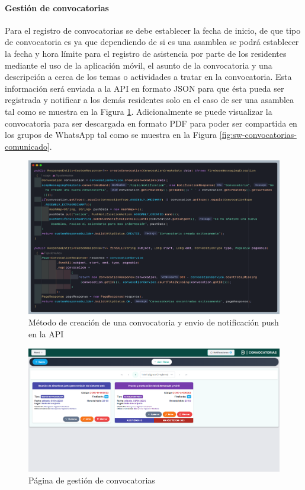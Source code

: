 \paragraph{Gestión de convocatorias}

Para el registro de convocatorias se debe establecer la fecha de inicio, de que tipo de convocatoria es ya que dependiendo de si es una asamblea se podrá establecer la fecha y hora límite para el registro de asistencia por parte de los residentes mediante el uso de la aplicación móvil, el asunto de la convocatoria y una descripción a cerca de los temas o actividades a tratar en la convocatoria.
Esta información será enviada a la API en formato JSON para que ésta pueda ser registrada y notificar a los demás residentes solo en el caso de ser una asamblea tal como se muestra en la Figura \ref{fig:api-convocation-create}.
Adicionalmente se puede visualizar la convocatoria para ser descargada en formato PDF para poder ser compartida en los grupos de WhatsApp tal como se muestra en la Figura \ref{fig:sw-convocatorias-comunicado}.


\begin{figure}[H]
    \centering
    \includegraphics[width=1\textwidth]{resources/images/api-convocation-create-usecase}
    \caption{Método de creación de una convocatoria y envio de notificación push en la API}
    \label{fig:api-convocation-create}
\end{figure}

\begin{figure}[H]
    \centering
    \includegraphics[width=1\textwidth]{resources/images/sw-convocatorias}
    \caption{Página de gestión de convocatorias}
    \label{fig:sw-convocatorias}
\end{figure}

